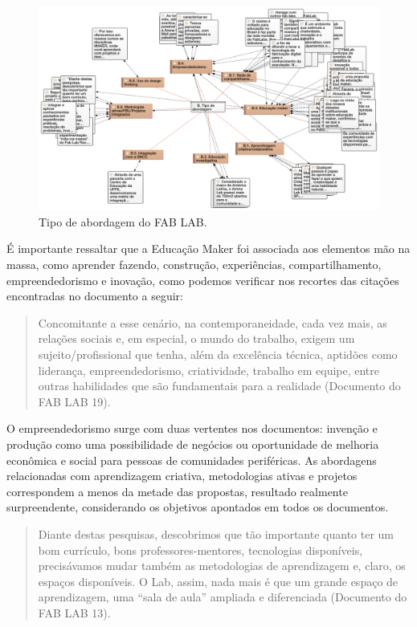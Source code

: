 \documentclass[portuguese]{textolivre}
\begin{document}
\begin{figure}[htbp]
\centering
\begin{minipage}{\textwidth}
\includegraphics[width=\linewidth]{Fig4.png}
\caption{Tipo de abordagem do FAB LAB.}
\label{fig4}
\end{minipage}
\end{figure}

É importante ressaltar que a Educação Maker foi associada aos elementos mão na massa, como aprender fazendo, construção, experiências, compartilhamento, empreendedorismo e inovação, como podemos verificar nos recortes das citações encontradas no documento a seguir:

\begin{quote}
    Concomitante a esse cenário, na contemporaneidade, cada vez mais, as relações sociais e, em especial, o mundo do trabalho, exigem um sujeito/profissional que tenha, além da excelência técnica, aptidões como liderança, empreendedorismo, criatividade, trabalho em equipe, entre outras habilidades que são fundamentais para a realidade (Documento do FAB LAB 19).
\end{quote}

O empreendedorismo surge com duas vertentes nos documentos: invenção e produção como uma possibilidade de negócios ou oportunidade de melhoria econômica e social para pessoas de comunidades periféricas. As abordagens relacionadas com aprendizagem criativa, metodologias ativas e projetos correspondem a menos da metade das propostas, resultado realmente surpreendente, considerando os objetivos apontados em todos os documentos.

\begin{quote}
    Diante destas pesquisas, descobrimos que tão importante quanto ter um bom currículo, bons professores-mentores, tecnologias disponíveis, precisávamos mudar também as metodologias de aprendizagem e, claro, os espaços disponíveis. O Lab, assim, nada mais é que um grande espaço de aprendizagem, uma ``sala de aula'' ampliada e diferenciada (Documento do FAB LAB 13).
\end{quote}
\end{document}
